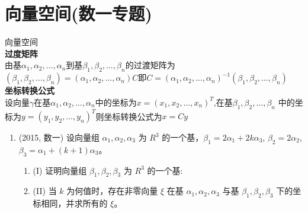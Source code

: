 \documentclass[12pt, a4paper, oneside, UTF8]{ctexbook}
\begin{document}
\section{向量空间(数一专题)}
\begin{remark}
    向量空间 \\
    \textbf{过度矩阵} \\
    由基$\alpha_1,\alpha_2,\ldots,\alpha_n$到基$\beta_1,\beta_2,\ldots,\beta_n$的过渡矩阵为$(\beta_1,\beta_2,\ldots,\beta_n)
    =(\alpha_1,\alpha_2,\ldots,\alpha_n)C$即$C=(\alpha_1,\alpha_2,\ldots,\alpha_n)^{-1}(\beta_1,\beta_2,\ldots,\beta_n)$ \\
    \textbf{坐标转换公式} \\
    设向量$\gamma$在基$\alpha_1,\alpha_2,\ldots,\alpha_n$中的坐标为$x=(x_1,x_2,\ldots,x_n)^{T}$,在基$\beta_1,\beta_2,\ldots,\beta_n$
    中的坐标为$y=(y_1,y_2,\ldots,y_n)^{T}$则坐标转换公式为$x=Cy$
\end{remark}
\begin{enumerate}[label=\arabic*.,start=8]
    \item (2015, 数一) 设向量组 $\alpha_1, \alpha_2, \alpha_3$ 为 $R^3$ 的一个基，$\beta_1 = 2\alpha_1 + 2k\alpha_3$, $\beta_2 = 2\alpha_2$,
    $\beta_3 = \alpha_1 + (k+1)\alpha_3$。
    \begin{enumerate}
        \item (I) 证明向量组 $\beta_1, \beta_2, \beta_3$ 为 $R^3$ 的一个基:
        \item (II) 当 $k$ 为何值时，存在非零向量 $\xi$ 在基 $\alpha_1, \alpha_2, \alpha_3$ 与基 $\beta_1, \beta_2, \beta_3$ 下的坐标相同，并求所有的 $\xi$。
    \end{enumerate}
    
    \begin{solution}
    \newpage
    \end{solution}
\end{enumerate}

\ifx\allfiles\undefined
\end{document}
